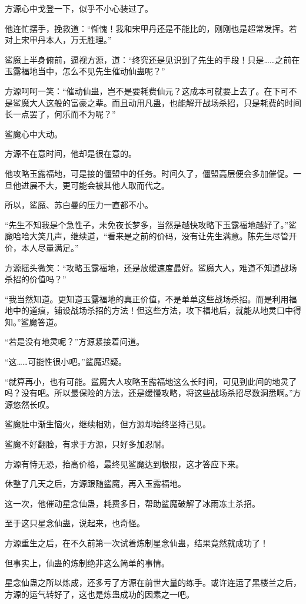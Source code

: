 \begin{this_body}
方源心中戈登一下，似乎不小心装过了。

他连忙摆手，挽救道：“惭愧！我和宋甲丹还是不能比的，刚刚也是超常发挥。若对上宋甲丹本人，万无胜理。”

鲨魔上半身俯前，逼视方源，道：“终究还是见识到了先生的手段！只是……之前在玉露福地当中，怎么不见先生催动仙蛊呢？”

方源呵呵一笑：“催动仙蛊，岂不是要耗费仙元？这成本可就要上去了。在下可不是鲨魔大人这般的富豪之辈。而且动用凡蛊，也能解开战场杀招，只是耗费的时间长一点罢了，何乐而不为呢？”

鲨魔心中大动。

方源不在意时间，他却是很在意的。

他攻略玉露福地，可是接的僵盟中的任务。时间久了，僵盟高层便会多加催促。一旦他进展不大，更可能会被其他人取而代之。

所以，鲨魔、苏白曼的压力一直都不小。

“先生不知我是个急性子，未免夜长梦多，当然是越快攻略下玉露福地越好了。”鲨魔哈哈大笑几声，继续道，“看来是之前的价码，没有让先生满意。陈先生尽管开价，本人尽量满足。”

方源摇头微笑：“攻略玉露福地，还是放缓速度最好。鲨魔大人，难道不知道战场杀招的价值吗？”

“我当然知道。更知道玉露福地的真正价值，不是单单这些战场杀招。而是利用福地中的道痕，铺设战场杀招的方法！但这些方法，攻下福地后，就能从地灵口中得知。”鲨魔答道。

“若是没有地灵呢？”方源紧接着问道。

“这……可能性很小吧。”鲨魔迟疑。

“就算再小，也有可能。鲨魔大人攻略玉露福地这么长时间，可见到此间的地灵了吗？没有吧。所以最保险的方法，还是缓慢攻略，将这些战场杀招尽数洞悉啊。”方源悠然长叹。

鲨魔肚中渐生恼火，继续相劝，但方源却始终坚持己见。

鲨魔不好翻脸，有求于方源，只好多加忍耐。

方源有恃无恐，抬高价格，最终见鲨魔达到极限，这才答应下来。

休整了几天之后，方源跟随鲨魔，再入玉露福地。

这一次，他催动星念仙蛊，耗费多日，帮助鲨魔破解了冰雨冻土杀招。

至于这只星念仙蛊，说起来，也奇怪。

方源重生之后，在不久前第一次试着炼制星念仙蛊，结果竟然就成功了！

但事实上，仙蛊的炼制绝非这么简单的事情。

星念仙蛊之所以炼成，还多亏了方源在前世大量的练手。或许连运了黑楼兰之后，方源的运气转好了，这也是炼蛊成功的因素之一吧。


\end{this_body}
